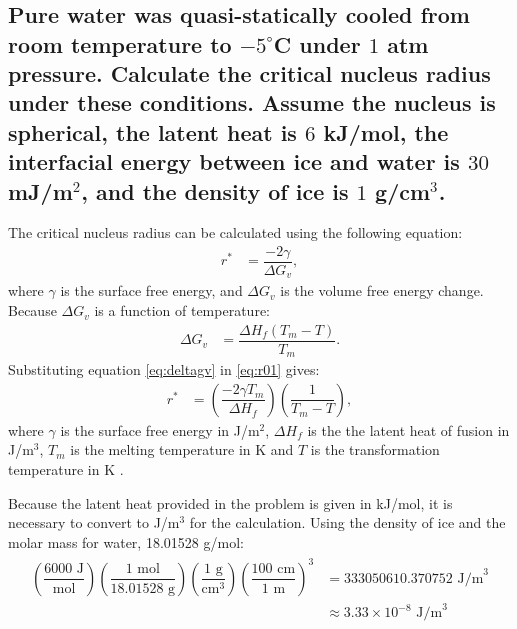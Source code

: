 \newpage
\section{}

\subsection{Pure water was quasi-statically cooled from room temperature to $-5^{\circ}$C under $1$ atm pressure. Calculate the critical nucleus radius under these conditions. Assume the nucleus is spherical, the latent heat is $6$ kJ/mol, the interfacial energy between ice and water is $30$ mJ/m$^2$, and the density of ice is $1$ g/cm$^3$.}

The critical nucleus radius can be calculated using the following equation: 
\begin{align}
  \label{eq:r01}
  r^*&=\dfrac{-2\gamma}{\Delta G_v},
\end{align}
where $\gamma$ is the surface free energy, and $\Delta G_v$ is the volume free energy change. Because $\Delta G_v$ is a function of temperature:
\begin{align}
  \label{eq:deltagv}
  \Delta G_v&= \dfrac{\Delta H_f\left(T_m-T\right)}{T_m}.
\end{align}
Substituting equation \ref{eq:deltagv} in \ref{eq:r01} gives: 
\begin{align}
  \label{eq:nucleus_radius}
  r^*&=\left(\dfrac{-2\gamma T_m}{\Delta H_f}\right)\left(\dfrac{1}{T_m - T}\right),
\end{align}
where $\gamma$ is the surface free energy in J/m$^2$, $\Delta H_f$ is the the latent heat of fusion in J/m$^3$, $T_m$ is the melting temperature in K and $T$ is the transformation temperature in K \citep[p.~346-347]{callister2010materials}.

Because the latent heat provided in the problem is given in kJ/mol, it is necessary to convert to J/m$^3$ for the calculation. Using the density of ice and the molar mass for water, 18.01528 g/mol:
\begin{align}
  \begin{split}
    \left(\dfrac{6000\text{ J}}{\text{mol}}\right)\left(\dfrac{1\text{ mol}}{18.01528\text{ g}}\right)\left(\dfrac{1\text{ g}}{\text{cm}^3}\right)\left(\dfrac{100\text{ cm}}{1\text{ m}}\right)^3&=333050610.370752 \text{ J/m}^3 \\
  &\approx 3.33\times10^{-8} \text{ J/m}^3
  \end{split}
  \label{eq:deltaH_calculation}
\end{align}


